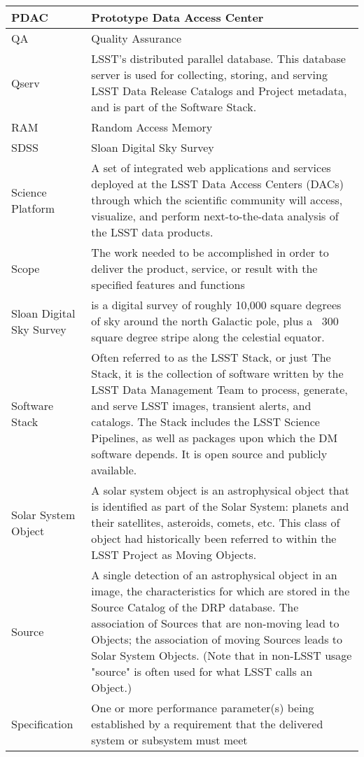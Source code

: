 \begin{longtable}{|p{}|p{}|}
PDAC & Prototype Data Access Center \\\hline
QA & Quality Assurance \\\hline
Qserv & LSST's distributed parallel database. This database server is used for collecting, storing, and serving LSST Data Release Catalogs and Project metadata, and is part of the Software Stack. \\\hline
RAM & Random Access Memory \\\hline
SDSS & Sloan Digital Sky Survey \\\hline
Science Platform & A set of integrated web applications and services deployed at the LSST Data Access Centers (DACs) through which the scientific community will access, visualize, and perform next-to-the-data analysis of the LSST data products. \\\hline
Scope & The work needed to be accomplished in order to deliver the product, service, or result with the specified features and functions \\\hline
Sloan Digital Sky Survey & is a digital survey of roughly 10,000 square degrees of sky around the north Galactic pole, plus a ~300 square degree stripe along the celestial equator. \\\hline
Software Stack & Often referred to as the LSST Stack, or just The Stack, it is the collection of software written by the LSST Data Management Team to process, generate, and serve LSST images, transient alerts, and catalogs. The Stack includes the LSST Science Pipelines, as well as packages upon which the DM software depends. It is open source and publicly available. \\\hline
Solar System Object & A solar system object is an astrophysical object that is identified as part of the Solar System: planets and their satellites, asteroids, comets, etc. This class of object had historically been referred to within the LSST Project as Moving Objects. \\\hline
Source & A single detection of an astrophysical object in an image, the characteristics for which are stored in the Source Catalog of the DRP database. The association of Sources that are non-moving lead to Objects; the association of moving Sources leads to Solar System Objects. (Note that in non-LSST usage "source" is often used for what LSST calls an Object.) \\\hline
Specification & One or more performance parameter(s) being established by a requirement that the delivered system or subsystem must meet \\\hline

\end{longtable}
